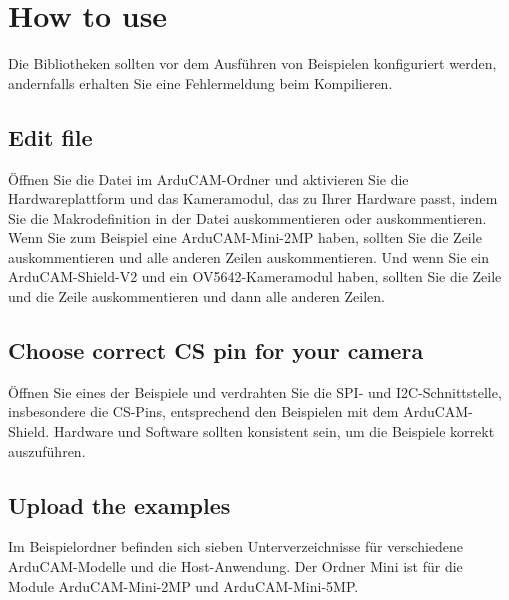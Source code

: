\section{How to use}

Die Bibliotheken sollten vor dem Ausführen von Beispielen konfiguriert werden, andernfalls erhalten Sie eine Fehlermeldung beim Kompilieren.

\subsection{Edit  file}

Öffnen Sie die Datei  im ArduCAM-Ordner und aktivieren Sie die Hardwareplattform und das Kameramodul, das zu Ihrer Hardware passt, indem Sie die Makrodefinition in der Datei auskommentieren oder auskommentieren. Wenn Sie zum Beispiel eine ArduCAM-Mini-2MP haben, sollten Sie die Zeile  auskommentieren und alle anderen Zeilen auskommentieren. Und wenn Sie ein ArduCAM-Shield-V2 und ein OV5642-Kameramodul haben, sollten Sie die Zeile  und die Zeile  auskommentieren und dann alle anderen Zeilen.

\subsection{Choose correct CS pin for your camera}

Öffnen Sie eines der Beispiele und verdrahten Sie die SPI- und I2C-Schnittstelle, insbesondere die CS-Pins, entsprechend den Beispielen mit dem ArduCAM-Shield. Hardware und Software sollten konsistent sein, um die Beispiele korrekt auszuführen.

\subsection{Upload the examples}


Im Beispielordner befinden sich sieben Unterverzeichnisse für verschiedene ArduCAM-Modelle und die Host-Anwendung. Der Ordner Mini ist für die Module ArduCAM-Mini-2MP und ArduCAM-Mini-5MP.

